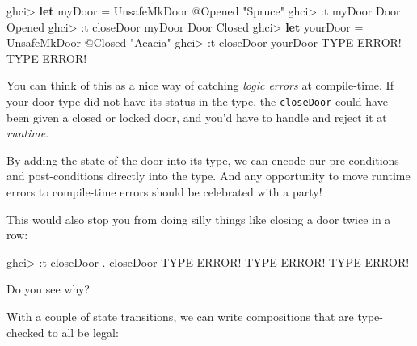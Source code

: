 \documentclass[]{article}
\newenvironment{Shaded}{}{}
\newcommand{\DataTypeTok}[1]{\textcolor[rgb]{0.56,0.13,0.00}{#1}}
\newcommand{\KeywordTok}[1]{\textcolor[rgb]{0.00,0.44,0.13}{\textbf{#1}}}
\newcommand{\NormalTok}[1]{#1}
\newcommand{\OperatorTok}[1]{\textcolor[rgb]{0.40,0.40,0.40}{#1}}
\newcommand{\OtherTok}[1]{\textcolor[rgb]{0.00,0.44,0.13}{#1}}
\newcommand{\StringTok}[1]{\textcolor[rgb]{0.25,0.44,0.63}{#1}}
\begin{document}
\begin{Shaded}
\begin{Highlighting}[]
\NormalTok{ghci}\OperatorTok{>} \KeywordTok{let}\NormalTok{ myDoor }\OtherTok{=} \DataTypeTok{UnsafeMkDoor} \OperatorTok{@}\DataTypeTok{\textquotesingle{}Opened} \StringTok{"Spruce"}
\NormalTok{ghci}\OperatorTok{>} \OperatorTok{:}\NormalTok{t myDoor}
\DataTypeTok{Door} \DataTypeTok{\textquotesingle{}Opened}
\NormalTok{ghci}\OperatorTok{>} \OperatorTok{:}\NormalTok{t closeDoor myDoor}
\DataTypeTok{Door} \DataTypeTok{\textquotesingle{}Closed}
\NormalTok{ghci}\OperatorTok{>} \KeywordTok{let}\NormalTok{ yourDoor }\OtherTok{=} \DataTypeTok{UnsafeMkDoor} \OperatorTok{@}\DataTypeTok{\textquotesingle{}Closed} \StringTok{"Acacia"}
\NormalTok{ghci}\OperatorTok{>} \OperatorTok{:}\NormalTok{t closeDoor yourDoor}
\DataTypeTok{TYPE} \DataTypeTok{ERROR}\OperatorTok{!}  \DataTypeTok{TYPE} \DataTypeTok{ERROR}\OperatorTok{!}
\end{Highlighting}
\end{Shaded}

You can think of this as a nice way of catching \emph{logic errors} at
compile-time. If your door type did not have its status in the type, the
\texttt{closeDoor} could have been given a closed or locked door, and you'd have
to handle and reject it at \emph{runtime}.

By adding the state of the door into its type, we can encode our pre-conditions
and post-conditions directly into the type. And any opportunity to move runtime
errors to compile-time errors should be celebrated with a party!

This would also stop you from doing silly things like closing a door twice in a
row:

\begin{Shaded}
\begin{Highlighting}[]
\NormalTok{ghci}\OperatorTok{>} \OperatorTok{:}\NormalTok{t closeDoor }\OperatorTok{.}\NormalTok{ closeDoor}
\DataTypeTok{TYPE} \DataTypeTok{ERROR}\OperatorTok{!}  \DataTypeTok{TYPE} \DataTypeTok{ERROR}\OperatorTok{!}  \DataTypeTok{TYPE} \DataTypeTok{ERROR}\OperatorTok{!}
\end{Highlighting}
\end{Shaded}

Do you see why?

With a couple of state transitions, we can write compositions that are
type-checked to all be legal:
\end{document}
